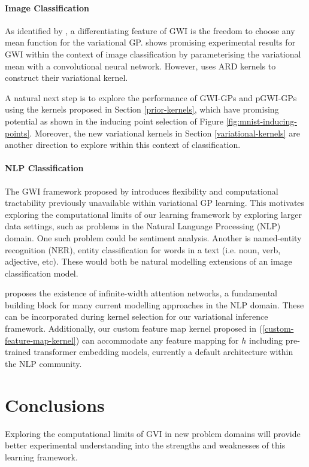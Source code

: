 \documentclass{article}
\numberwithin{equation}{section}
\begin{document}
\paragraph{Image Classification} 
As identified by \cite{wild2022generalized}, a differentiating feature of GWI is the freedom to choose any mean function for the variational GP. 
\cite{wild2022generalized} shows promising experimental results for GWI within the context of image classification by parameterising the variational mean with a convolutional neural network.
However, \cite{wild2022generalized} uses ARD kernels to construct their variational kernel.

A natural next step is to explore the performance of GWI-GPs and pGWI-GPs using the kernels proposed in Section \ref{prior-kernels}, which have promising potential as shown in the inducing point selection of Figure \ref{fig:mnist-inducing-points}.
Moreover, the new variational kernels in Section \ref{variational-kernels} are another direction to explore within this context of classification.

\paragraph{NLP Classification} The GWI framework proposed by \cite{wild2022generalized} introduces flexibility and computational tractability previously unavailable within variational GP learning. 
This motivates exploring the computational limits of our learning framework by exploring larger data settings, such as problems in the Natural Language Processing (NLP) domain.
One such problem could be sentiment analysis. Another is named-entity recognition (NER), entity classification for words in a text (i.e. noun, verb, adjective, etc). These would both be natural modelling extensions of an image classification model.

\cite{pmlr-v119-hron20a} proposes the existence of infinite-width attention networks, a fundamental building block for many current modelling approaches in the NLP domain. 
These can be incorporated during kernel selection for our variational inference framework.
Additionally, our custom feature map kernel proposed in (\ref{custom-feature-map-kernel}) can accommodate any feature mapping for $h$ including pre-trained transformer embedding models, currently a default architecture within the NLP community. 
\newpage
\section{Conclusions}\label{section:conclusions}
Exploring the computational limits of GVI in new problem domains will provide better experimental understanding into the strengths and weaknesses of this learning framework.
\end{document}
